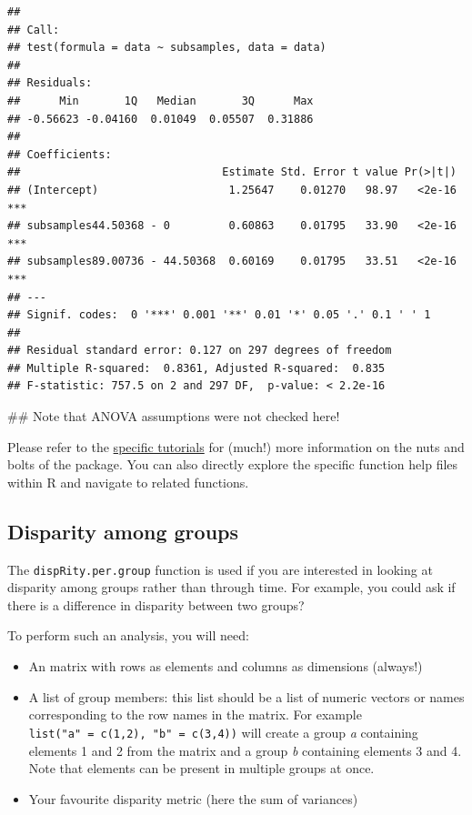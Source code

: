 \documentclass[]{book}
\newenvironment{Shaded}{\begin{snugshade}}{\end{snugshade}}
\newcommand{\NormalTok}[1]{#1}
\providecommand{\tightlist}{%
  \setlength{\itemsep}{0pt}\setlength{\parskip}{0pt}}
\theoremstyle{definition}
\theoremstyle{definition}
\theoremstyle{remark}
\begin{document}
\begin{verbatim}
## 
## Call:
## test(formula = data ~ subsamples, data = data)
## 
## Residuals:
##      Min       1Q   Median       3Q      Max 
## -0.56623 -0.04160  0.01049  0.05507  0.31886 
## 
## Coefficients:
##                               Estimate Std. Error t value Pr(>|t|)    
## (Intercept)                    1.25647    0.01270   98.97   <2e-16 ***
## subsamples44.50368 - 0         0.60863    0.01795   33.90   <2e-16 ***
## subsamples89.00736 - 44.50368  0.60169    0.01795   33.51   <2e-16 ***
## ---
## Signif. codes:  0 '***' 0.001 '**' 0.01 '*' 0.05 '.' 0.1 ' ' 1
## 
## Residual standard error: 0.127 on 297 degrees of freedom
## Multiple R-squared:  0.8361, Adjusted R-squared:  0.835 
## F-statistic: 757.5 on 2 and 297 DF,  p-value: < 2.2e-16
\end{verbatim}

\begin{Shaded}
\begin{Highlighting}[]
\NormalTok{## Note that ANOVA assumptions were not checked here!}
\end{Highlighting}
\end{Shaded}

Please refer to the \protect\hyperlink{specific-tutorial}{specific
tutorials} for (much!) more information on the nuts and bolts of the
package. You can also directly explore the specific function help files
within R and navigate to related functions.

\hypertarget{disparity-among-groups}{\subsection{Disparity among
groups}\label{disparity-among-groups}}

The \texttt{dispRity.per.group} function is used if you are interested
in looking at disparity among groups rather than through time. For
example, you could ask if there is a difference in disparity between two
groups?

To perform such an analysis, you will need:

\begin{itemize}
\tightlist
\item
  An matrix with rows as elements and columns as dimensions (always!)
\item
  A list of group members: this list should be a list of numeric vectors
  or names corresponding to the row names in the matrix. For example
  \texttt{list("a"\ =\ c(1,2),\ "b"\ =\ c(3,4))} will create a group
  \emph{a} containing elements 1 and 2 from the matrix and a group
  \emph{b} containing elements 3 and 4. Note that elements can be
  present in multiple groups at once.
\item
  Your favourite disparity metric (here the sum of variances)
\end{itemize}
\end{document}
